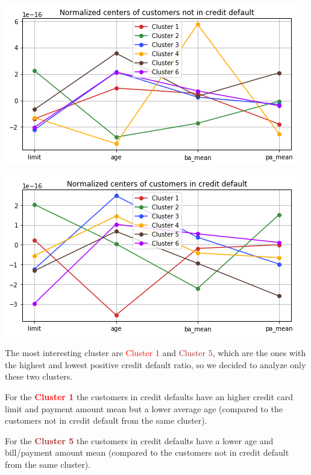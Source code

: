 \begin{center}

\includegraphics[width=.7\textwidth]{img/ch3/kmeans_par_default_no}

\includegraphics[width=.7\textwidth]{img/ch3/kmeans_par_default_yes}

\end{center}

The most interesting cluster are \textcolor{red}{Cluster 1} and \textcolor{brown}{Cluster 5}, which are the ones with the highest and lowest positive credit default ratio, so we decided to analyze only these two clusters.

\medskip

For the \textbf{\textcolor{red}{Cluster 1}} the customers in credit defaults have an higher credit card limit and payment amount mean but a lower average age (compared to the customers not in credit default from the same cluster).

\medskip

For the \textbf{\textcolor{brown}{Cluster 5}} the customers in credit defaults have a lower age and bill/payment amount mean (compared to the customers not in credit default from the same cluster).

